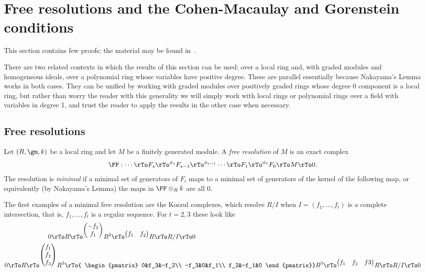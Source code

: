 \section{Free resolutions and the Cohen-Macaulay and Gorenstein conditions}
This section contains few proofs; the material may be found in~\cite[Chapter ****]{Eisenbud1995}.

\begin{remark}
 There are two related contexts in which the results of this section can be used: over a local ring and, with graded modules and homogeneous ideals, over a polynomial ring whose variables have positive degree. These are parallel essentially because Nakayama's Lemma works in both cases. They can be unified by working with graded modules over positively graded rings whose degree 0 component is a local ring, but rather than worry the reader with this generality we will simply work with local rings or polynomial rings over a field with variables in degree 1, and trust the reader to apply the results in the other case when necessary.
\end{remark}

\subsection{Free resolutions}
Let $(R,\gm, k)$ be a local ring and let $M$ be a finitely generated module. A \emph{free resolution} of $M$ is an exact complex
$$
\FF: \cdots \rTo F_s \rTo^{\phi_s} F_{s-1} \rTo^{\phi_{s-1}} \cdots \rTo F_1 \rTo^{\phi_1}  F_0 \rTo M \rTo 0.
$$
The resolution is \emph{minimal} if a minimal set of generators of $F_i$ maps to a minimal set of generators of the kernel of the following map,
or equivalently (by Nakayama's Lemma) the maps in $\FF\otimes_R k$ are all 0.

The first examples of a minimal free resolution are the Koszul complexes, which resolve $R/I$ when
 $I = (f_1,\dots, f_t)$
is a complete intersection, that is, $f_1,\dots, f_t$ is a regular sequence.  For $t = 2,3$ these look like
$$
\begin{aligned}
 0\rTo &R \rTo^{
\begin{pmatrix}
-f_2\\f_1
\end{pmatrix}}
 R^2\rTo^{
 \begin{pmatrix}
f_1&f_2
\end{pmatrix}}
 R \rTo R/I \rTo 0\\
0\rTo R \rTo^{
\begin{pmatrix}
f_1\\f_2\\f_3
\end{pmatrix}} R^3&\rTo{
\begin{pmatrix}
 0&f_3&-f_2\\
 -f_3&0&f_1\\
 f_2&-f_1&0
\end{pmatrix}}
 R^3\rTo^{
 \begin{pmatrix}
f_1&f_2&f3
\end{pmatrix}}R \rTo R/I \rTo 0
\end{aligned}
$$


